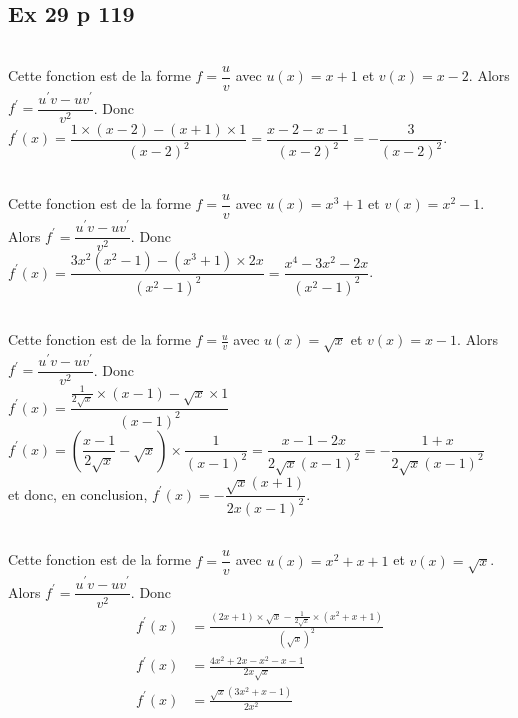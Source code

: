 \documentclass[12pt,a5paper]{book}
\begin{document}
\subsection*{Ex 29 p 119}
\begin{enumMet}
    \item {}\\
    Cette fonction est de la forme $f=\dfrac{u}{v}$ avec $u(x)=x+1$ et $v(x)=x-2$. Alors $f^{\prime}=\dfrac{u^{\prime} v-u v^{\prime}}{v^{2}}$. Donc \\ 
    $ f^{\prime}(x)=\dfrac{1 \times(x-2)-(x+1) \times 1}{(x-2)^{2}}=\dfrac{x-2-x-1}{(x-2)^{2}}=-\dfrac{3}{(x-2)^{2}}$.
    \item {}\\
    Cette fonction est de la forme $f=\dfrac{u}{v}$ avec $u(x)=x^{3}+1$ et $v(x)=x^{2}-1$. Alors $f^{\prime}=\dfrac{u^{\prime} v-u v^{\prime}}{v^{2}}$. Donc \\
    $f^{\prime}(x)=\dfrac{3 x^{2}\left(x^{2}-1\right)-\left(x^{3}+1\right) \times 2 x}{\left(x^{2}-1\right)^{2}}=\dfrac{x^{4}-3 x^{2}-2 x}{\left(x^{2}-1\right)^{2}}$.
    \item {}\\
    Cette fonction est de la forme $f=\frac{u}{v}$ avec $u(x)=\sqrt{x}$ et $v(x)=x-1$. Alors $f^{\prime}=\dfrac{u^{\prime} v-u v^{\prime}}{v^{2}}$. Donc \\
    $f^{\prime}(x)=\dfrac{\frac{1}{2 \sqrt{x}} \times(x-1)-\sqrt{x} \times 1}{(x-1)^{2}}$\\
    $f^{\prime}(x)=\left(\dfrac{x-1}{2 \sqrt{x}}-\sqrt{x}\right) \times \dfrac{1}{(x-1)^{2}}=\dfrac{x-1-2 x}{2 \sqrt{x}(x-1)^{2}}=-\dfrac{1+x}{2 \sqrt{x}(x-1)^{2}}$\\
    et donc, en conclusion, $f^{\prime}(x)=-\dfrac{\sqrt{x}(x+1)}{2 x(x-1)^{2}}$.
    \newpage
    \item {}\\
    Cette fonction est de la forme $f=\dfrac{u}{v}$ avec $u(x)=x^{2}+x+1$ et $v(x)=\sqrt{x}$. Alors  $f^{\prime}=\dfrac{u^{\prime} v-u v^{\prime}}{v^{2}}$. Donc \\
    $$
    \begin{aligned}
    f^{\prime}(x)&=\frac{(2 x+1) \times \sqrt{x}-\frac{1}{2 \sqrt{x}} \times\left(x^{2}+x+1\right)}{(\sqrt{x})^{2}} \\
    f^{\prime}(x)&=\frac{4 x^{2}+2 x-x^{2}-x-1}{2 x \sqrt{x}} \\
    f^{\prime}(x)&=\frac{\sqrt{x}\left(3 x^{2}+x-1\right)}{2 x^{2}}
    \end{aligned}
    $$
\end{enumMet}
\end{document}
